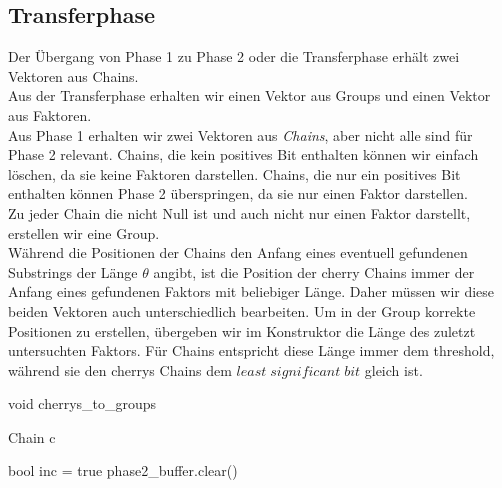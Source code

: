 \subsection{Transferphase}
Der Übergang von Phase 1 zu Phase 2 oder die Transferphase erhält zwei Vektoren aus Chains.\\
Aus der Transferphase erhalten wir einen Vektor aus Groups und einen Vektor aus Faktoren.\\
\newpage
\noindent
Aus Phase 1 erhalten wir zwei Vektoren aus \textit{Chains}, aber nicht alle sind für Phase 2 relevant. Chains, die kein positives Bit enthalten können wir einfach löschen, da sie keine Faktoren darstellen.
Chains, die nur ein positives Bit enthalten können Phase 2 überspringen, da sie nur einen Faktor darstellen.\\
Zu jeder Chain die nicht Null ist und auch nicht nur einen Faktor darstellt, erstellen wir eine Group.\\
Während die Positionen der Chains den Anfang eines eventuell gefundenen Substrings der Länge $\theta$ angibt, ist die Position der cherry Chains immer der Anfang eines gefundenen Faktors mit beliebiger Länge. Daher müssen wir diese beiden Vektoren auch unterschiedlich bearbeiten.
Um in der Group korrekte Positionen zu erstellen, übergeben wir im Konstruktor die Länge des zuletzt untersuchten Faktors. Für Chains entspricht diese Länge immer dem threshold, während sie den cherrys Chains dem $least\; significant\; bit$ gleich ist.
\begin{algorithm}[ht!]
	\caption{	void cherrys\_to\_groups}

		
		Chain c\;
		
		bool inc = true\;
		phase2\_buffer.clear()\;
	
\end{algorithm}
